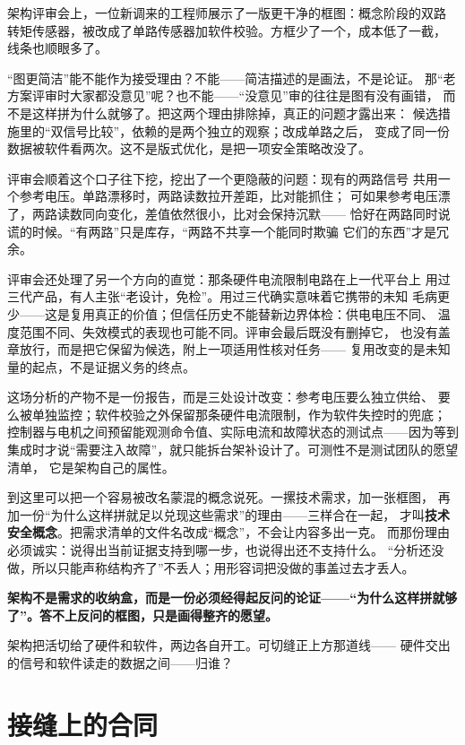 架构评审会上，一位新调来的工程师展示了一版更干净的框图：概念阶段的双路
转矩传感器，被改成了单路传感器加软件校验。方框少了一个，成本低了一截，
线条也顺眼多了。

“图更简洁”能不能作为接受理由？不能——简洁描述的是画法，不是论证。
那“老方案评审时大家都没意见”呢？也不能——“没意见”审的往往是图有没有画错，
而不是这样拼为什么就够了。把这两个理由排除掉，真正的问题才露出来：
候选措施里的“双信号比较”，依赖的是两个独立的观察；改成单路之后，
变成了同一份数据被软件看两次。这不是版式优化，是把一项安全策略改没了。

评审会顺着这个口子往下挖，挖出了一个更隐蔽的问题：现有的两路信号
共用一个参考电压。单路漂移时，两路读数拉开差距，比对能抓住；
可如果参考电压漂了，两路读数同向变化，差值依然很小，比对会保持沉默——
恰好在两路同时说谎的时候。“有两路”只是库存，“两路不共享一个能同时欺骗
它们的东西”才是冗余。

评审会还处理了另一个方向的直觉：那条硬件电流限制电路在上一代平台上
用过三代产品，有人主张“老设计，免检”。用过三代确实意味着它携带的未知
毛病更少——这是复用真正的价值；但信任历史不能替新边界体检：供电电压不同、
温度范围不同、失效模式的表现也可能不同。评审会最后既没有删掉它，
也没有盖章放行，而是把它保留为候选，附上一项适用性核对任务——
复用改变的是未知量的起点，不是证据义务的终点。

这场分析的产物不是一份报告，而是三处设计改变：参考电压要么独立供给、
要么被单独监控；软件校验之外保留那条硬件电流限制，作为软件失控时的兜底；
控制器与电机之间预留能观测命令值、实际电流和故障状态的测试点——因为等到
集成时才说“需要注入故障”，就只能拆台架补设计了。可测性不是测试团队的愿望清单，
它是架构自己的属性。

到这里可以把一个容易被改名蒙混的概念说死。一摞技术需求，加一张框图，
再加一份“为什么这样拼就足以兑现这些需求”的理由——三样合在一起，
才叫\textbf{技术安全概念}。把需求清单的文件名改成“概念”，不会让内容多出一克。
而那份理由必须诚实：说得出当前证据支持到哪一步，也说得出还不支持什么。
“分析还没做，所以只能声称结构齐了”不丢人；用形容词把没做的事盖过去才丢人。

\textbf{架构不是需求的收纳盒，而是一份必须经得起反问的论证——“为什么这样拼就够了”。答不上反问的框图，只是画得整齐的愿望。}

架构把活切给了硬件和软件，两边各自开工。可切缝正上方那道线——
硬件交出的信号和软件读走的数据之间——归谁？

\section{接缝上的合同}

